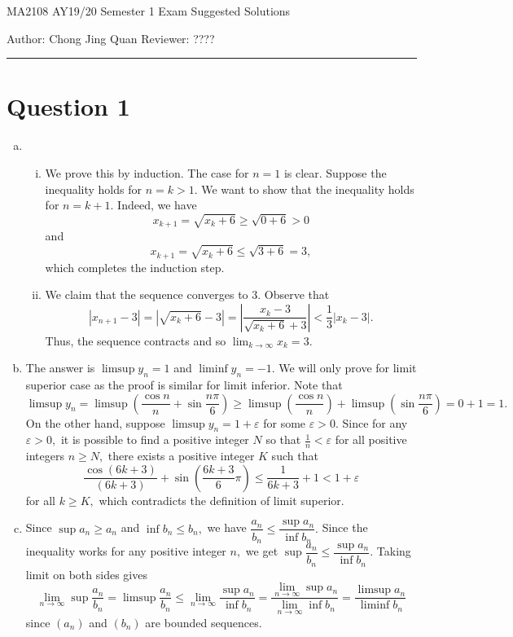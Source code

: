 \documentclass{article}
\begin{document}
    {\LARGE{MA2108 AY19/20 Semester 1 Exam Suggested Solutions}}
    \vspace{0.2in}
    
    Author: Chong Jing Quan \hfill Reviewer: ????
    
    \par\noindent\rule{\textwidth}{0.4pt}
\section*{Question 1}
\begin{enumerate}[(a)]
    \item \begin{enumerate}[(i)]
        \item We prove this by induction. The case for $n=1$ is clear. Suppose the inequality holds for $n=k>1.$ We want to show that the inequality holds for $n=k+1.$ Indeed, we have $$x_{k+1}=\sqrt{x_k+6}\geq\sqrt{0+6}>0$$ and $$x_{k+1}=\sqrt{x_k+6}\leq\sqrt{3+6}=3,$$ which completes the induction step.
        \item We claim that the sequence converges to 3. Observe that $$|x_{n+1}-3|=|\sqrt{x_k+6}-3|=\left|\frac{x_k-3}{\sqrt{x_k+6}+3}\right|<\frac{1}{3}|x_k-3|.$$ Thus, the sequence contracts and so $\displaystyle\lim_{k\to\infty}x_k=3.$
    \end{enumerate}
    \item The answer is $\limsup y_n=1$ and $\liminf y_n=-1.$ We will only prove for limit superior case as the proof is similar for limit inferior. Note that
    $$\limsup y_n=\limsup \left(\frac{\cos n}{n}+\sin\frac{n\pi}{6}\right)\geq\limsup\left(\frac{\cos n}{n}\right)+\limsup\left(\sin\frac{n\pi}{6}\right)=0+1=1.$$
    On the other hand, suppose $\limsup y_n=1+\varepsilon$ for some $\varepsilon>0.$ Since for any $\varepsilon>0,$ it is possible to find a positive integer $N$ so that $\frac{1}{n}<\varepsilon$ for all positive integers $n\geq N,$ there exists a positive integer $K$ such that $$\frac{\cos (6k+3)}{(6k+3)}+\sin\left(\frac{6k+3}{6}\pi\right)\leq\frac{1}{6k+3}+1<1+\varepsilon$$ for all $k\geq K,$ which contradicts the definition of limit superior.
    \item Since $\sup a_n\geq a_n$ and $\inf b_n\leq b_n,$ we have $\dfrac{a_n}{b_n}\leq \dfrac{\sup a_n}{\inf b_n}.$ Since the inequality works for any positive integer $n,$ we get $\sup\dfrac{a_n}{b_n}\leq \dfrac{\sup a_n}{\inf b_n}.$ Taking limit on both sides gives $$\lim_{n\to\infty}\sup\frac{a_n}{b_n}=\limsup\frac{a_n}{b_n}\leq \lim_{n\to\infty}\dfrac{\sup a_n}{\inf b_n}=\dfrac{\lim_{n\to\infty}\sup a_n}{\lim_{n\to\infty}\inf b_n}=\frac{\limsup a_n}{\liminf b_n}$$ since $(a_n)$ and $(b_n)$ are bounded sequences.
\end{enumerate}
\end{document}
